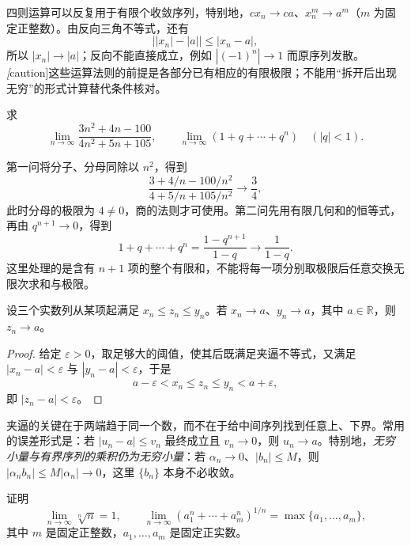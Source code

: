 四则运算可以反复用于有限个收敛序列，特别地，$c x_n\to ca$、$x_n^m\to a^m$（$m$ 为固定正整数）。由反向三角不等式，还有
\[
    \bigl||x_n|-|a|\bigr|\leq|x_n-a|,
\]
所以 $|x_n|\to|a|$；反向不能直接成立，例如 $|(-1)^n|\to1$ 而原序列发散。\emph[caution]{这些运算法则的前提是各部分已有相应的有限极限；不能用“拆开后出现无穷”的形式计算替代条件核对。}

\begin{example}
\label{ex:sequence-limit-arithmetic-applications}
求
\[
    \lim_{n\to\infty}\frac{3n^2+4n-100}{4n^2+5n+105},
    \qquad
    \lim_{n\to\infty}(1+q+\cdots+q^n)\quad(|q|<1).
\]
\end{example}

\begin{solve}
第一问将分子、分母同除以 $n^2$，得到
\[
    \frac{3+4/n-100/n^2}{4+5/n+105/n^2}\to\frac34,
\]
此时分母的极限为 $4\neq0$，商的法则才可使用。第二问先用有限几何和的恒等式，再由 $q^{n+1}\to0$，得到
\[
    1+q+\cdots+q^n=\frac{1-q^{n+1}}{1-q}\to\frac1{1-q}.
\]
这里处理的是含有 $n+1$ 项的整个有限和，不能将每一项分别取极限后任意交换无限次求和与极限。
\end{solve}

\begin{theorem}[夹逼收敛原理]
\label{thm:squeeze-principle-for-sequences}
设三个实数列从某项起满足 $x_n\leq z_n\leq y_n$。若 $x_n\to a$、$y_n\to a$，其中 $a\in\mathbb{R}$，则 $z_n\to a$。
\end{theorem}

\begin{proof}
给定 $\varepsilon>0$，取足够大的阈值，使其后既满足夹逼不等式，又满足 $|x_n-a|<\varepsilon$ 与 $|y_n-a|<\varepsilon$，于是
\[
    a-\varepsilon<x_n\leq z_n\leq y_n<a+\varepsilon,
\]
即 $|z_n-a|<\varepsilon$。
\end{proof}

夹逼的关键在于两端趋于同一个数，而不在于给中间序列找到任意上、下界。常用的误差形式是：若 $|u_n-a|\leq v_n$ 最终成立且 $v_n\to0$，则 $u_n\to a$。特别地，\emph{无穷小量与有界序列的乘积仍为无穷小量}：若 $\alpha_n\to0$、$|b_n|\leq M$，则 $|\alpha_n b_n|\leq M|\alpha_n|\to0$，这里 $\{b_n\}$ 本身不必收敛。

\begin{example}
\label{ex:nth-root-limits-by-squeeze}
证明
\[
    \lim_{n\to\infty}\sqrt[n]{n}=1,
    \qquad
    \lim_{n\to\infty}\left(a_1^n+\cdots+a_m^n\right)^{1/n}
    =\max\{a_1,\ldots,a_m\},
\]
其中 $m$ 是固定正整数，$a_1,\ldots,a_m$ 是固定正实数。
\end{example}

